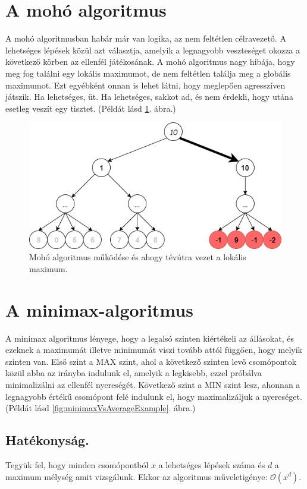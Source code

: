 \documentclass[twoside, a4paper, 12pt]{book}
\begin{document}
\section{A mohó algoritmus}
A mohó algoritmusban habár már van logika, az nem feltétlen célravezető. A lehetséges lépések közül azt választja, amelyik a legnagyobb veszteséget okozza a következő körben az ellenfél játékosának. A mohó algoritmus nagy hibája, hogy meg fog találni egy lokális maximumot, de nem feltétlen találja meg a globális maximumot. Ezt egyébként onnan is lehet látni, hogy meglepően agresszíven játszik. Ha lehetséges, üt. Ha lehetséges, sakkot ad, és nem érdekli, hogy utána esetleg veszít egy tisztet.
(Példát lásd \ref{fig:greedyAlgorithmExampleDangerous}. ábra.)
\begin{figure}[htbp]
	\centering
	\includegraphics[width=\textwidth]{img/greedyAlgorithmExampleDangerous.png}
	\caption{Mohó algoritmus működése és ahogy tévútra vezet a lokális maximum.}
	\label{fig:greedyAlgorithmExampleDangerous}
\end{figure}

\section{A minimax-algoritmus}
A minimax algoritmus lényege, hogy a legalsó szinten kiértékeli az állásokat, és ezeknek a maximumát illetve minimumát viszi tovább attól függően, hogy melyik szinten van. Első szint a MAX szint, ahol a következő szinten levő csomópontok közül abba az irányba indulunk el, amelyik a legkisebb, ezzel próbálva minimalizálni az ellenfél nyereségét. Következő szint a MIN szint lesz, ahonnan a legnagyobb értékű csomópont felé indulunk el, hogy maximalizáljuk a nyereséget. (Példát lásd \ref{fig:minimaxVsAverageExample}. ábra.)\cite{bevMiHu}
\subsection{Hatékonyság.} Tegyük fel, hogy minden csomópontból $x$ a lehetséges lépések száma és $d$ a maximum mélység amit vizsgálunk. Ekkor az algoritmus műveletigénye: $ \mathcal{O}(x^d)$.
\end{document}
